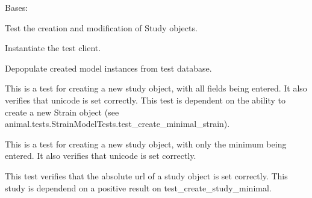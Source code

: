 \documentclass[letterpaper,10pt,english]{sphinxmanual}
\begin{document}
\begin{fulllineitems}
\label{api:data.tests.StudyModelTests}
Bases: 

Test the creation and modification of Study objects.


\begin{fulllineitems}
\label{api:data.tests.StudyModelTests.setUp}
Instantiate the test client.

\end{fulllineitems}



\begin{fulllineitems}
\label{api:data.tests.StudyModelTests.tearDown}
Depopulate created model instances from test database.

\end{fulllineitems}



\begin{fulllineitems}
\label{api:data.tests.StudyModelTests.test_create_studey_detailed}
This is a test for creating a new study object, with all fields being entered.  It also verifies that unicode is set correctly.  This test is dependent on the ability to create a new Strain object (see animal.tests.StrainModelTests.test\_create\_minimal\_strain).

\end{fulllineitems}



\begin{fulllineitems}
\label{api:data.tests.StudyModelTests.test_create_study_minimal}
This is a test for creating a new study object, with only the minimum being entered.  It also verifies that unicode is set correctly.

\end{fulllineitems}



\begin{fulllineitems}
\label{api:data.tests.StudyModelTests.test_study_absolute_url}
This test verifies that the absolute url of a study object is set correctly.  This study is dependend on a positive result on test\_create\_study\_minimal.

\end{fulllineitems}


\end{fulllineitems}
\end{document}
